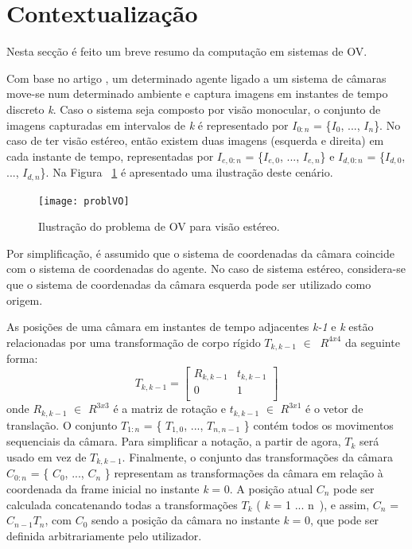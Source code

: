 \section{Contextualização}

Nesta secção é feito um breve resumo da computação em sistemas de OV.

Com base no artigo \cite{VOpart1}, um determinado agente ligado a um sistema de câmaras move-se num determinado ambiente e captura imagens em instantes de tempo discreto \textit{k}. Caso o sistema seja composto por visão monocular, o conjunto de imagens capturadas em intervalos de \textit{k} é representado por  \textit{$I_{0:n}$}  = \{\textit{$I_0$}, ..., \textit{$I_n$}\}. 
No caso de ter visão estéreo, então existem duas imagens (esquerda e direita) em cada instante de tempo, representadas por \textit{$I_{e,0:n}$} = \{\textit{$I_{e,0}$}, ..., \textit{$I_{e,n}$}\} e \textit{$I_{d,0:n}$} = \{\textit{$I_{d,0}$}, ..., \textit{$I_{d,n}$}\}. 
Na Figura ~\ref{fig:arch} é apresentado uma ilustração deste cenário. 


\begin{figure}[h!] %
	\begin{center}
		\leavevmode		
		\texttt{[image: problVO]}
		\caption{Ilustração do problema de OV para visão estéreo.  \cite{VOpart1}}
		\label{fig:arch}
	\end{center}
\end{figure}



Por simplificação, é assumido que o sistema de coordenadas da câmara coincide com o sistema de coordenadas do agente. No caso de sistema estéreo, considera-se que o sistema de coordenadas da câmara esquerda pode ser utilizado como origem.

As posições de uma câmara em instantes de tempo adjacentes \textit{k-1} e \textit{k} estão relacionadas por uma transformação de corpo rígido $T_{k,k-1}$ $\in\ $ $R^{4x4}$ da seguinte forma: \[ T_{k,k-1} = \left[\begin{array}{cc} R_{k,k-1} & t_{k,k-1} \\  0 & 1 \\ \end{array} \right] \]
onde $R_{k,k-1}$ $\in$ $R^{3x3}$ é a matriz de rotação e $t_{k,k-1}$ $\in$ $R^{3x1}$ é o vetor de translação. O conjunto $T_{1:n}$ = \{ $T_{1,0}$, ..., $T_{n,n-1}$ \} contém todos os movimentos sequenciais da câmara. Para simplificar
a notação, a partir de agora, $T_k$ será usado em vez de $T_{k,k-1}$. Finalmente, o conjunto das transformações da câmara $C_{0:n}$ = \{ $C_0$, ..., $C_n$ \} representam as transformações da câmara em relação à coordenada da frame inicial no instante \textit{k} = 0. A posição atual $C_n$ pode ser calculada concatenando todas a transformações $T_k$ ( \textit{k} = 1 ... n\ ), e assim, $C_n$ = $C_{n-1}T_n$, com $C_0$ sendo a posição da câmara no instante \textit{k} = 0, que pode ser definida arbitrariamente pelo utilizador.

